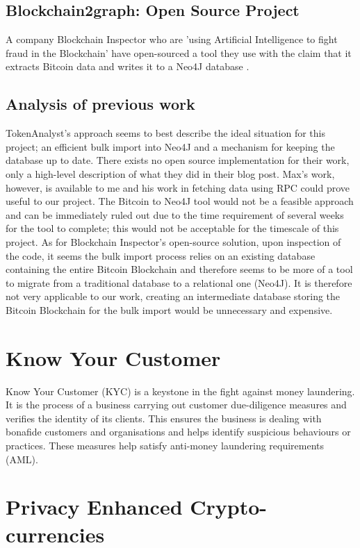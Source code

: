 \subsection{Blockchain2graph: Open Source Project}
A company Blockchain Inspector who are 'using Artificial Intelligence to fight fraud in the Blockchain' have open-sourced a tool they use with the claim that it extracts Bitcoin data and writes it to a Neo4J database \cite{RefWorks:doc:5cac6184e4b01c076c63e173}.

\subsection{Analysis of previous work}
TokenAnalyst's approach seems to best describe the ideal situation for this project; an efficient bulk import into Neo4J and a mechanism for keeping the database up to date. There exists no open source implementation for their work, only a high-level description of what they did in their blog post. Max's work, however, is available to me and his work in fetching data using RPC could prove useful to our project. The Bitcoin to Neo4J tool would not be a feasible approach and can be immediately ruled out due to the time requirement of several weeks for the tool to complete; this would not be acceptable for the timescale of this project. As for Blockchain Inspector's open-source solution, upon inspection of the code, it seems the bulk import process relies on an existing database containing the entire Bitcoin Blockchain and therefore seems to be more of a tool to migrate from a traditional database to a relational one (Neo4J). It is therefore not very applicable to our work, creating an intermediate database storing the Bitcoin Blockchain for the bulk import would be unnecessary and expensive.

\section{Know Your Customer}\label{background-kyc}
Know Your Customer (KYC) is a keystone in the fight against money laundering. It is the process of a business carrying out customer due-diligence measures and verifies the identity of its clients. This ensures the business is dealing with bonafide customers and organisations and helps identify suspicious behaviours or practices. These measures help satisfy anti-money laundering requirements (AML). 

\section{Privacy Enhanced Crypto-currencies}

